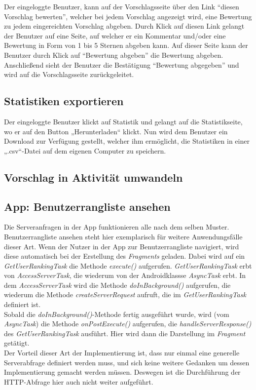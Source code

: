 Der eingeloggte Benutzer, kann auf der Vorschlagsseite über den Link
``diesen Vorschlag bewerten'', welcher bei jedem Vorschlag angezeigt
wird, eine Bewertung zu jedem eingereichten Vorschlag abgeben. Durch
Klick auf diesen Link gelangt der Benutzer auf eine Seite, auf welcher
er ein Kommentar und/oder eine Bewertung in Form von 1 bis 5 Sternen
abgeben kann. Auf dieser Seite kann der Benutzer durch Klick auf
 ``Bewertung abgeben'' die Bewertung abgeben. Anschließend sieht
 der Benutzer die Bestätigung ``Bewertung abgegeben'' und wird auf die Vorschlagsseite zurückgeleitet.
 

\subsection{Statistiken exportieren}
Der eingeloggte Benutzer klickt auf Statistik und gelangt auf die Statistikseite, wo er auf den Button „Herunterladen“ klickt. Nun wird dem Benutzer ein Download zur Verfügung gestellt, welcher ihm ermöglicht, die Statistiken in einer „.csv“-Datei auf dem eigenen Computer zu speichern.\\
\subsection{Vorschlag in Aktivität umwandeln}
\subsection{App: Benutzerrangliste ansehen}
Die Serveranfragen in der App funktionieren alle nach dem selben Muster. Benutzerrangliste ansehen steht hier exemplarisch für weitere Anwendungsfälle dieser Art.
Wenn der Nutzer in der App zur Benutzerrangliste navigiert, wird diese automatisch bei der Erstellung des \emph{Fragments} geladen. Dabei wird auf ein \emph{GetUserRankingTask} die Methode \emph{execute()} aufgerufen. \emph{GetUserRankingTask} erbt von \emph{AccessServerTask}, die wiederum von der Androidklassse \emph{AsyncTask} erbt. In dem \emph{AccessServerTask} wird die Methode \emph{doInBackground()} aufgerufen, die wiederum die Methode \emph{createServerRequest} aufruft, die im \emph{GetUserRankingTask} definiert ist.\\
Sobald die \emph{doInBackground()}-Methode fertig ausgeführt wurde, wird (vom \emph{AsyncTask}) die Methode \emph{onPostExecute()} aufgerufen, die \emph{handleServerResponse()} des \emph{GetUserRankingTask} ausführt. Hier wird dann die Darstellung im \emph{Fragment} getätigt.\\
Der Vorteil dieser Art der Implementierung ist, dass nur einmal eine generelle Serverabfrage definiert werden muss, und sich keine weitere Gedanken um dessen Implementierung gemacht werden m\"ussen. Deswegen ist die Durchführung der HTTP-Abfrage hier auch nicht weiter aufgeführt.